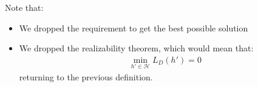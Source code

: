 \documentclass[../template.tex]{subfiles}
\begin{document}
Note that:
\begin{itemize}
    \item We dropped the requirement to get the best possible solution
    \item We dropped the realizability theorem, which would mean that:
    \begin{align*}
        \min_{h'\in \mathcal{H}} L_D(h') = 0
    \end{align*}
    returning to the previous definition.
\end{itemize}
\end{document}
